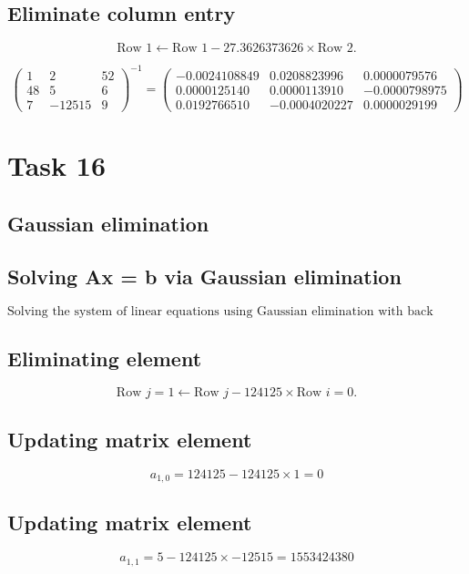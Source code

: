 \documentclass{article}
\begin{document}
\subsection*{ \vspace{1em} Eliminate column entry}
\[
\text{Row } 1 \leftarrow \text{Row }1 - 27.3626373626 \times \text{Row } 2.
\]
\medskip

\[
\begin{pmatrix}1 & 2 & 52 \\ 48 & 5 & 6 \\ 7 & -12515 & 9\end{pmatrix}^{-1} = \begin{pmatrix}-0.0024108849 & 0.0208823996 & 0.0000079576 \\ 0.0000125140 & 0.0000113910 & -0.0000798975 \\ 0.0192766510 & -0.0004020227 & 0.0000029199\end{pmatrix}
\]
\bigskip

\hrulefill
\bigskip

\section*{Task 16}

\subsection*{Gaussian elimination}
\subsection*{ \vspace{1em} Solving Ax = b via Gaussian elimination}
\[
\text{Solving the system of linear equations using Gaussian elimination with back substitution.}
\]
\subsection*{ \vspace{1em} Eliminating element}
\[
\text{Row } j = 1 \leftarrow \text{Row } j - 124125 \times \text{Row } i = 0.
\]
\subsection*{ \vspace{1em} Updating matrix element}
\[
a_{1,0} = 124125 - 124125 \times 1 = 0
\]
\subsection*{ \vspace{1em} Updating matrix element}
\[
a_{1,1} = 5 - 124125 \times -12515 = 1553424380
\]
\end{document}
